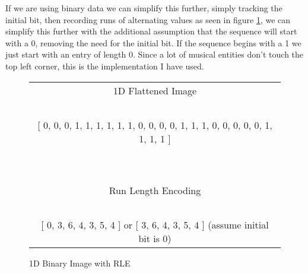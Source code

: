 If we are using binary data we can simplify this further, simply tracking the initial bit, then recording runs of alternating values as seen in figure \ref{fig:rle-1d-binary}, we can simplify this further with the additional assumption \parencite{fujinaga1996adaptive} that the sequence will start with a 0, removing the need for the initial bit. If the sequence begins with a 1 we just start with an entry of length 0. Since a lot of musical entities don't touch the top left corner, this is the implementation I have used.

\begin{figure}
  \centering

  \begin{tabular}{c}

  1D Flattened Image \\
  \ \\
  {[} 0, 0, 0, 1, 1, 1, 1, 1, 1, 0, 0, 0, 0, 1, 1, 1, 0, 0, 0, 0, 0, 1, 1, 1, 1 {]} \\
  \ \\
  \hline
  \ \\
  Run Length Encoding \\
  \ \\
  {[} 0, 3, 6, 4, 3, 5, 4 {]} or {[} 3, 6, 4, 3, 5, 4 {]} (assume initial bit is 0) \\
  \end{tabular}
  \caption{1D Binary Image with RLE}
  \label{fig:rle-1d-binary}
\end{figure}
